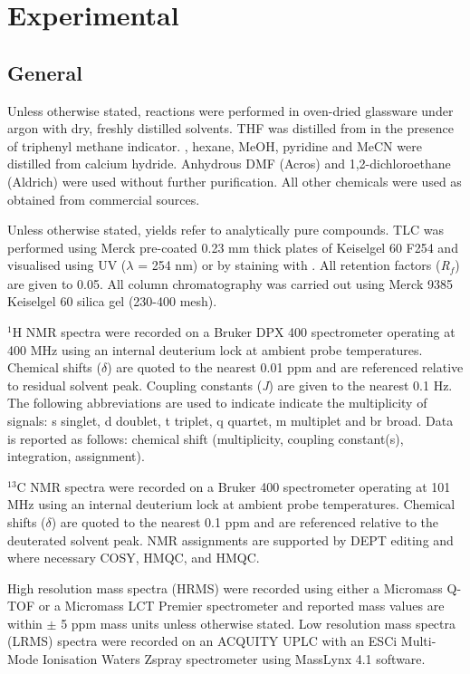 \newpage

\section{Experimental}

\subsection{General}

Unless otherwise stated, reactions were performed in oven-dried glassware under argon with dry, freshly distilled solvents. THF was distilled from  in the presence of triphenyl methane indicator. , hexane, MeOH, pyridine and MeCN were distilled from calcium hydride. Anhydrous DMF (Acros) and 1,2-dichloroethane (Aldrich) were used without further purification. All other chemicals were used as obtained from commercial sources.

Unless otherwise stated, yields refer to analytically pure compounds. TLC was performed using Merck pre-coated 0.23 mm thick plates of Keiselgel 60 F254 and visualised using UV ($\lambda$ = 254 nm) or by staining with . 
All retention factors (\textit{R}$_\textit{f}$) are given to 0.05. 
All column chromatography was carried out using Merck 9385 Keiselgel 60 silica gel (230-400 mesh).

$^1$H NMR spectra were recorded on a Bruker DPX 400 spectrometer operating at 400 MHz using an internal deuterium lock at ambient probe temperatures. Chemical shifts ($\delta$) are quoted to the nearest 0.01 ppm and are referenced relative to residual solvent peak\cite{Gottlieb1997}. Coupling constants (\textit{J}) are given to the nearest 0.1 Hz. The following abbreviations are used to indicate indicate the multiplicity of signals: s singlet, d doublet, t triplet, q quartet, m multiplet and br broad. Data is reported as follows: chemical shift (multiplicity, coupling constant(s), integration, assignment).

$^{13}$C NMR spectra were recorded on a Bruker 400 spectrometer operating at 101 MHz using an internal deuterium lock at ambient probe temperatures. Chemical shifts ($\delta$) are quoted to the nearest 0.1 ppm and are referenced relative to the deuterated solvent peak\cite{Gottlieb1997}. NMR assignments are supported by DEPT editing and where necessary COSY, HMQC, and HMQC. 

High resolution mass spectra (HRMS) were recorded using either a Micromass Q-TOF or a Micromass LCT Premier spectrometer and reported mass values are within $\pm$ 5 ppm mass units unless otherwise stated. Low resolution mass spectra (LRMS) spectra were recorded on an ACQUITY UPLC with an ESCi Multi-Mode Ionisation Waters Zspray spectrometer using MassLynx 4.1 software.

